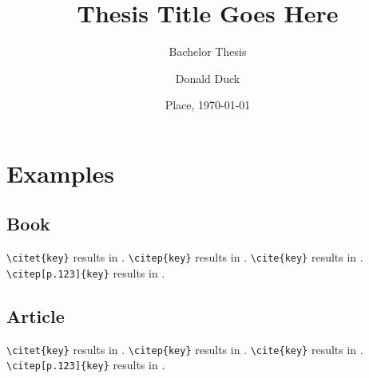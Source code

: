 

\usepackage{sebithesistitle}

\title{Thesis Title Goes Here}
\subtitle{Bachelor Thesis}
\author{Donald Duck}
\def\place{Place}
\date{\place, \today}

\def\documentname{Project	Plan for Bachelor Thesis Project}
\def\studentname{Donald Duck}
\def\snumber{1234567}
\def\course{Informatics - Software Engineering}
\def\period{February 2017 - July 2017}
\def\companyname{company abc}
\def\companyaddress{Some Address}
\def\companypostcodecity{12345, Somewhere}
\def\companycountry{Germany}
\def\companycoach{John Doe}
\def\companycoachmail{john.doe@company.com}
\def\universitytutor{Lecturer A}
\def\universitytutormail{lecturer.a@fontys.nl}
\def\examinator{Professional A}
\def\externalexpert{Professional B}
\def\hasnda{no}




\maketitle


\newpage

\newpage
\chapter{Examples}
\section{Book}
\noindent
\verb=\citet{key}= results in \citet{goetz2006java}. \newline
\verb=\citep{key}= results in \citep{goetz2006java}. \newline
\verb=\cite{key}= results in \cite{goetz2006java}. \newline
\verb=\citep[p.123]{key}= results in \citep[p. 123]{goetz2006java}.

\section{Article}
\noindent
\verb=\citet{key}= results in \citet{cattell2011scalable}. \newline
\verb=\citep{key}= results in \citep{cattell2011scalable}. \newline
\verb=\cite{key}= results in \cite{cattell2011scalable}. \newline
\verb=\citep[p.123]{key}= results in \citep[p. 123]{cattell2011scalable}.

